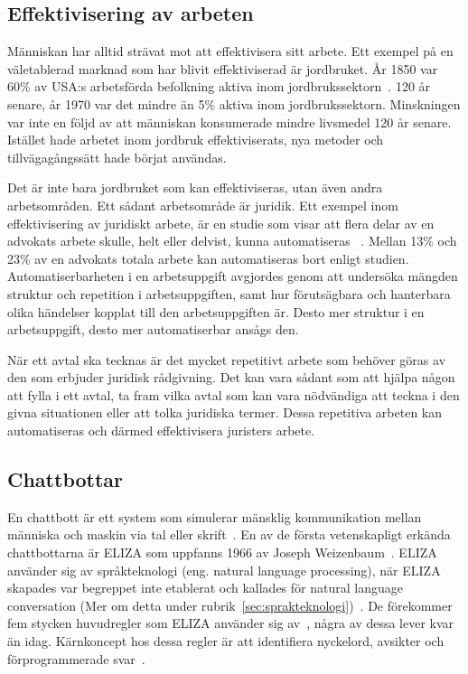 \documentclass[a4paper,12pt]{article}
\begin{document}
\subsection{Effektivisering av arbeten}
Människan har alltid strävat mot att effektivisera sitt arbete. Ett exempel på en väl\-etablerad marknad som har blivit effektiviserad är jordbruket. År 1850 var 60\% av USA:s arbetsförda befolkning aktiva inom jordbrukssektorn~\cite{web:job-lost-job-gained}. 120 år senare, år 1970 var det mindre än 5\% aktiva inom jordbrukssektorn. Minskningen var inte en följd av att människan konsumerade mindre livsmedel 120 år senare. Istället hade arbetet inom jordbruk effektiviserats, nya metoder och tillvägagångssätt hade börjat användas. 


Det är inte bara jordbruket som kan effektiviseras, utan även andra arbetsområden. Ett sådant arbetsområde är juridik. Ett exempel inom effektivisering av juridiskt arbete, är en studie som visar att flera delar av en advokats arbete skulle, helt eller delvist, kunna automatiseras ~\cite{web:lawyers-auto}. Mellan 13\% och 23\% av en advokats totala arbete kan automatiseras bort enligt studien. Automatiserbarheten i en arbetsuppgift avgjordes genom att undersöka mängden struktur och repetition i arbetsuppgiften, samt hur förutsägbara och hanterbara olika händelser kopplat till den arbetsuppgiften är. Desto mer struktur i en arbetsuppgift, desto mer automatiserbar ansågs den.

När ett avtal ska tecknas är det mycket repetitivt arbete som behöver göras av den som erbjuder juridisk rådgivning. Det kan vara sådant som att hjälpa någon att fylla i ett avtal, ta fram vilka avtal som kan vara nödvändiga att teckna i den givna situationen eller att tolka juridiska termer. Dessa repetitiva arbeten kan automatiseras och därmed effektivisera juristers arbete. 

\subsection{Chattbottar}
En chattbott är ett system som simulerar mänsklig kommunikation mellan människa och maskin via tal eller skrift~\cite{web:mauldin-chatbot}. 
En av de första vetenskapligt erkända chattbottarna är ELIZA som uppfanns 1966 av Joseph Weizenbaum~\cite{web:dylanavalverde-chatbots}.
ELIZA använder sig av språkteknologi (eng. natural language processing), när ELIZA skapades var begreppet inte etablerat och kallades för natural language conversation (Mer om detta under rubrik~\ref{sec:sprakteknologi})~\cite{web:Eliza-weizenbaum}.
De förekommer fem stycken huvudregler som ELIZA använder sig av~\cite{web:Eliza-weizenbaum}, några av dessa lever kvar än idag. Kärn\-koncept hos dessa regler är att identifiera nyckelord, avsikter och förprogrammerade svar~\cite{web:dylanavalverde-chatbots}.
\end{document}
